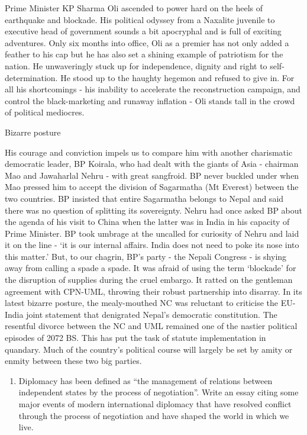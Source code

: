 \documentclass[
  openany]{book}
\providecommand{\tightlist}{%
  \setlength{\itemsep}{0pt}\setlength{\parskip}{0pt}}
\begin{document}
Prime Minister KP Sharma Oli ascended to power hard on the heels of earthquake and blockade. His political odyssey from a Naxalite juvenile to executive head of government sounds a bit apocryphal and is full of exciting adventures. Only six months into office, Oli as a premier has not only added a feather to his cap but he has also set a shining example of patriotism for the nation. He unwaveringly stuck up for independence, dignity and right to self-determination. He stood up to the haughty hegemon and refused to give in. For all his shortcomings - his inability to accelerate the reconstruction campaign, and control the black-marketing and runaway inflation - Oli stands tall in the crowd of political mediocres.

Bizarre posture

His courage and conviction impels us to compare him with another charismatic democratic leader, BP Koirala, who had dealt with the giants of Asia - chairman Mao and Jawaharlal Nehru - with great sangfroid. BP never buckled under when Mao pressed him to accept the division of Sagarmatha (Mt Everest) between the two countries. BP insisted that entire Sagarmatha belongs to Nepal and said there was no question of splitting its sovereignty. Nehru had once asked BP about the agenda of his visit to China when the latter was in India in his capacity of Prime Minister. BP took umbrage at the uncalled for curiosity of Nehru and laid it on the line - `it is our internal affairs. India does not need to poke its nose into this matter.' But, to our chagrin, BP's party - the Nepali Congress - is shying away from calling a spade a spade. It was afraid of using the term `blockade' for the disruption of supplies during the cruel embargo. It ratted on the gentleman agreement with CPN-UML, throwing their robust partnership into disarray. In its latest bizarre posture, the mealy-mouthed NC was reluctant to criticise the EU-India joint statement that denigrated Nepal's democratic constitution. The resentful divorce between the NC and UML remained one of the nastier political episodes of 2072 BS. This has put the task of statute implementation in quandary. Much of the country's political course will largely be set by amity or enmity between these two big parties.

\begin{enumerate}
\def\labelenumi{\arabic{enumi}.}
\setcounter{enumi}{2}
\tightlist
\item
  Diplomacy has been defined as ``the management of relations between independent states by the process of negotiation''. Write an essay citing some major events of modern international diplomacy that have resolved conflict through the process of negotiation and have shaped the world in which we live.
\end{enumerate}
\end{document}
